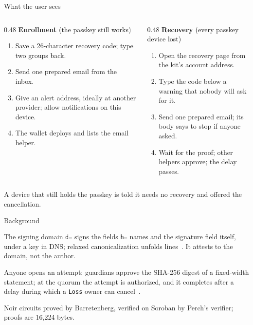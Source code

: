 \documentclass[aspectratio=169,11pt]{beamer}
\begin{document}
\begin{frame}{What the user sees}
  \small
  \begin{columns}[T]
    \begin{column}{0.48\textwidth}
      \textbf{Enrollment} (the passkey still works)
      \begin{enumerate}\footnotesize
        \item Save a 26-character recovery code; type two groups back.
        \item Send one prepared email from the inbox.
        \item Give an alert address, ideally at another provider; allow
          notifications on this device.
        \item The wallet deploys and lists the email helper.
      \end{enumerate}
      \footnotesize{}
    \end{column}
    \begin{column}{0.48\textwidth}
      \textbf{Recovery} (every passkey device lost)
      \begin{enumerate}\footnotesize
        \item Open the recovery page from the kit's account address.
        \item Type the code below a warning that nobody will ask for it.
        \item Send one prepared email; its body says to stop if anyone asked.
        \item Wait for the proof; other helpers approve; the delay passes.
      \end{enumerate}
      \footnotesize{}
    \end{column}
  \end{columns}
  \medskip
  A device that still holds the passkey is told it needs no recovery and
  offered the cancellation.
\end{frame}

\begin{frame}{Background}
  \begin{description}\small
    \item[DKIM] The signing domain \texttt{d=} signs the fields \texttt{h=}
      names and the signature field itself, under a key in DNS; relaxed
      canonicalization unfolds lines~\cite{rfc6376,rfc8301}. It attests to
      the domain, not the author.
    \item[Perch recovery] Anyone opens an attempt; guardians approve the
      SHA-256 digest of a fixed-width statement; at the quorum the attempt is
      authorized, and it completes after a delay during which a
      \texttt{Loss} owner can cancel~\cite{perch-recovery-spec}.
    \item[UltraHonk] Noir circuits proved by Barretenberg, verified on
      Soroban by Perch's verifier; proofs are 16{,}224 bytes.
  \end{description}
\end{frame}
\end{document}
